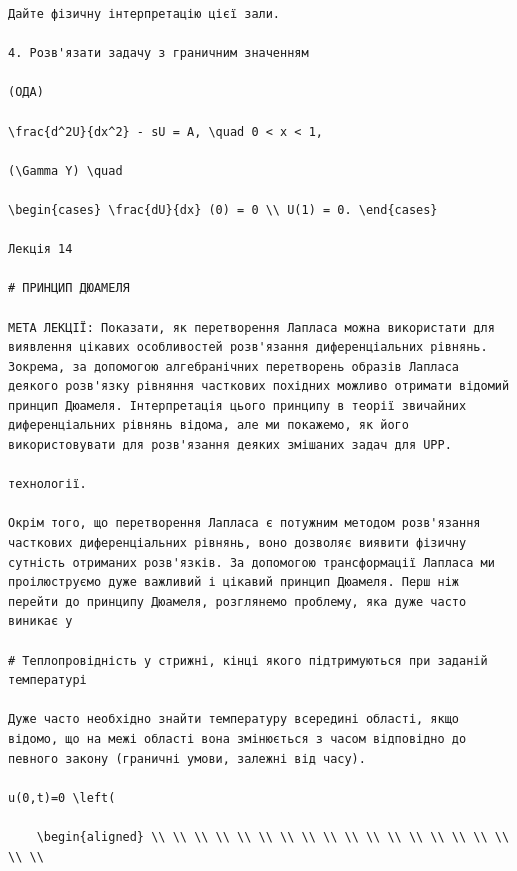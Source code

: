 \documentclass[
  ukrainian,
]{article}
\begin{document}
\begin{verbatim}
Дайте фізичну інтерпретацію цієї зали.

4. Розв'язати задачу з граничним значенням

(ОДА)

\frac{d^2U}{dx^2} - sU = A, \quad 0 < x < 1,

(\Gamma Y) \quad

\begin{cases} \frac{dU}{dx} (0) = 0 \\ U(1) = 0. \end{cases}

Лекція 14

# ПРИНЦИП ДЮАМЕЛЯ

МЕТА ЛЕКЦІЇ: Показати, як перетворення Лапласа можна використати для виявлення цікавих особливостей розв'язання диференціальних рівнянь. Зокрема, за допомогою алгебранічних перетворень образів Лапласа деякого розв'язку рівняння часткових похідних можливо отримати відомий принцип Дюамеля. Інтерпретація цього принципу в теорії звичайних диференціальних рівнянь відома, але ми покажемо, як його використовувати для розв'язання деяких змішаних задач для UPP.

технології.

Окрім того, що перетворення Лапласа є потужним методом розв'язання часткових диференціальних рівнянь, воно дозволяє виявити фізичну сутність отриманих розв'язків. За допомогою трансформації Лапласа ми проілюструємо дуже важливий і цікавий принцип Дюамеля. Перш ніж перейти до принципу Дюамеля, розглянемо проблему, яка дуже часто виникає у

# Теплопровідність у стрижні, кінці якого підтримуються при заданій температурі

Дуже часто необхідно знайти температуру всередині області, якщо відомо, що на межі області вона змінюється з часом відповідно до певного закону (граничні умови, залежні від часу).

u(0,t)=0 \left(

    \begin{aligned} \\ \\ \\ \\ \\ \\ \\ \\ \\ \\ \\ \\ \\ \\ \\ \\ \\ \\ \\


\end{verbatim}
\end{document}

